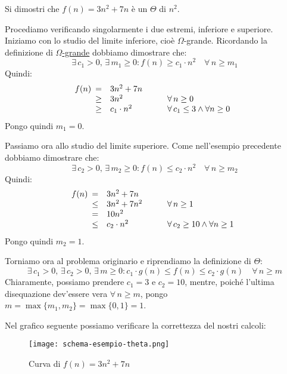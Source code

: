 \begin{eg}
    Si dimostri che $f(n)=3n^2+7n$ è un $\Theta$ di $n^2$.

    \bigskip\noindent
    Procediamo verificando singolarmente i due estremi, inferiore e superiore.
    Iniziamo con lo studio del limite inferiore, cioè $\Omega$-grande. Ricordando
    la definizione di \hyperref[def:5]{\emph{$\Omega$}-grande} dobbiamo dimostrare
    che:
    \[\exists\,c_1>0,\,\exists\,m_1\geq0:f(n)\geq c_1\cdot n^2\quad\forall\,n\geq m_1\]
    Quindi:
    \[f(n)\begin{array}[t]{cll}
            =   &   3n^2+7n     & \\
            \geq&   3n^2        & \qquad\forall\,n\geq0\\
            \geq&   c_1\cdot n^2& \qquad\forall\,c_1\leq3\wedge\forall n\geq0
    \end{array}\]
    Pongo quindi $m_1=0$.

    \bigskip\noindent
    Passiamo ora allo studio del limite superiore. Come nell'esempio precedente
    dobbiamo dimostrare che:
    \[\exists\,c_2>0,\,\exists\,m_2\geq0:f(n)\leq c_2\cdot n^2\quad\forall\,n\geq m_2\]
    Quindi:
    \[f(n)\begin{array}[t]{cll}
        =   &   3n^2+7n     & \\
        \leq&   3n^2+7n^2   & \qquad\forall\,n\geq1\\
        =   &   10n^2       & \\
        \leq&   c_2\cdot n^2& \qquad\forall\,c_2\geq10\wedge\forall n\geq1
    \end{array}\]
    Pongo quindi $m_2=1$.

    \bigskip\noindent
    Torniamo ora al problema originario e riprendiamo la definizione di
    \hyperref[def:6]{$\Theta$}:
    \[\exists\,c_1>0,\,\exists\,c_2>0,\,\exists\,m\geq0:
    c_1\cdot g(n)\leq f(n)\leq c_2\cdot g(n)\quad\forall\,n\geq m\]
    Chiaramente, possiamo prendere $c_1=3$ e $c_2=10$, mentre,
    poiché l'ultima disequazione dev'essere vera $\forall\,n\geq m$,
    pongo $m=\max\{m_1,m_2\}=\max\{0,1\}=1$.

    \newpage\noindent
    Nel grafico seguente possiamo verificare la correttezza del
    nostri calcoli:
    \begin{figure}[h]
        \centering
        \texttt{[image: schema-esempio-theta.png]}
        \caption{Curva di $f(n)=3n^2+7n$}
    \end{figure}
\end{eg}

